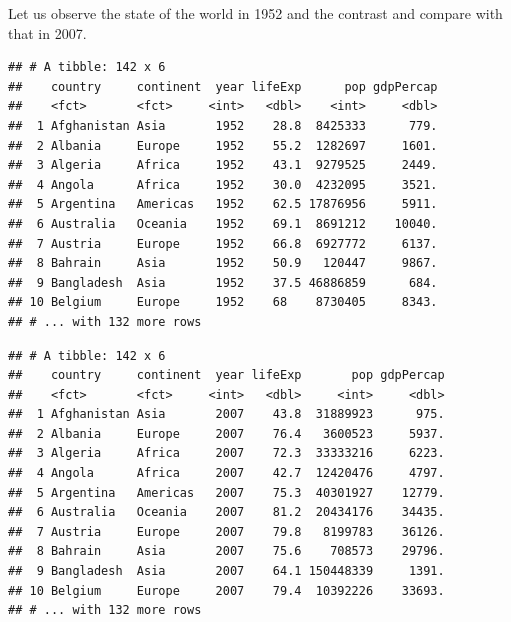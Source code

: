 \documentclass[11pt,]{article}
\newenvironment{Shaded}{\begin{snugshade}}{\end{snugshade}}
\newcommand{\KeywordTok}[1]{\textcolor[rgb]{0.13,0.29,0.53}{\textbf{#1}}}
\newcommand{\DecValTok}[1]{\textcolor[rgb]{0.00,0.00,0.81}{#1}}
\newcommand{\StringTok}[1]{\textcolor[rgb]{0.31,0.60,0.02}{#1}}
\newcommand{\CommentTok}[1]{\textcolor[rgb]{0.56,0.35,0.01}{\textit{#1}}}
\newcommand{\OperatorTok}[1]{\textcolor[rgb]{0.81,0.36,0.00}{\textbf{#1}}}
\newcommand{\NormalTok}[1]{#1}
\begin{document}
Let us observe the state of the world in 1952 and the contrast and
compare with that in 2007.

\begin{Shaded}
\end{Shaded}

\begin{verbatim}
## # A tibble: 142 x 6
##    country     continent  year lifeExp      pop gdpPercap
##    <fct>       <fct>     <int>   <dbl>    <int>     <dbl>
##  1 Afghanistan Asia       1952    28.8  8425333      779.
##  2 Albania     Europe     1952    55.2  1282697     1601.
##  3 Algeria     Africa     1952    43.1  9279525     2449.
##  4 Angola      Africa     1952    30.0  4232095     3521.
##  5 Argentina   Americas   1952    62.5 17876956     5911.
##  6 Australia   Oceania    1952    69.1  8691212    10040.
##  7 Austria     Europe     1952    66.8  6927772     6137.
##  8 Bahrain     Asia       1952    50.9   120447     9867.
##  9 Bangladesh  Asia       1952    37.5 46886859      684.
## 10 Belgium     Europe     1952    68    8730405     8343.
## # ... with 132 more rows
\end{verbatim}

\begin{Shaded}
\end{Shaded}

\begin{verbatim}
## # A tibble: 142 x 6
##    country     continent  year lifeExp       pop gdpPercap
##    <fct>       <fct>     <int>   <dbl>     <int>     <dbl>
##  1 Afghanistan Asia       2007    43.8  31889923      975.
##  2 Albania     Europe     2007    76.4   3600523     5937.
##  3 Algeria     Africa     2007    72.3  33333216     6223.
##  4 Angola      Africa     2007    42.7  12420476     4797.
##  5 Argentina   Americas   2007    75.3  40301927    12779.
##  6 Australia   Oceania    2007    81.2  20434176    34435.
##  7 Austria     Europe     2007    79.8   8199783    36126.
##  8 Bahrain     Asia       2007    75.6    708573    29796.
##  9 Bangladesh  Asia       2007    64.1 150448339     1391.
## 10 Belgium     Europe     2007    79.4  10392226    33693.
## # ... with 132 more rows
\end{verbatim}
\end{document}
